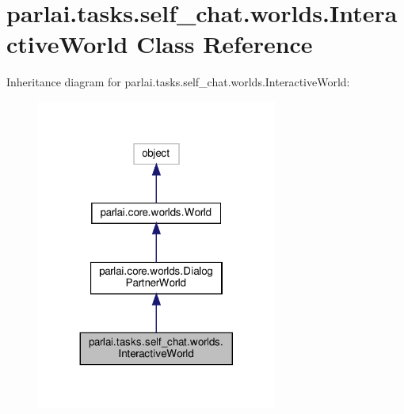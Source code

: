 \hypertarget{classparlai_1_1tasks_1_1self__chat_1_1worlds_1_1InteractiveWorld}{}\section{parlai.\+tasks.\+self\+\_\+chat.\+worlds.\+Interactive\+World Class Reference}
\label{classparlai_1_1tasks_1_1self__chat_1_1worlds_1_1InteractiveWorld}


Inheritance diagram for parlai.\+tasks.\+self\+\_\+chat.\+worlds.\+Interactive\+World\+:
\nopagebreak
\begin{figure}[H]
\begin{center}
\leavevmode
\includegraphics[width=224pt]{classparlai_1_1tasks_1_1self__chat_1_1worlds_1_1InteractiveWorld__inherit__graph}
\end{center}
\end{figure}


